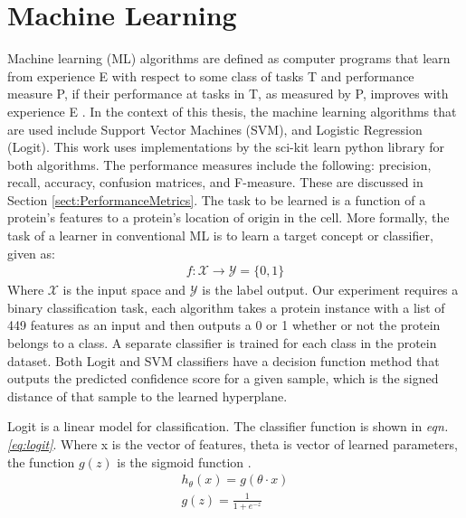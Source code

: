 \documentclass[ms]{nuthesis}
\begin{document}
\section{Machine Learning}
\label{sect:machineLearn}
Machine learning (ML) algorithms are defined as computer programs that learn from experience E
with respect to some class of tasks T and performance measure P, if their performance at
tasks in T, as measured by P, improves with experience E \cite{mitchell}. In the context of this thesis,
the machine learning algorithms that are used include Support Vector Machines (SVM), and Logistic Regression (Logit).
 This work uses implementations by the sci-kit learn python library \cite{sklearn-api} for both algorithms. The performance
 measures include the following: precision, recall, accuracy, confusion matrices, and F-measure. These are discussed in
 Section \ref{sect:PerformanceMetrics}. The task to be learned is a function of a protein's
    features to a protein's location of origin in the cell. More formally, the task of a learner in conventional ML
    is to learn a target concept or classifier, given as:
 \FloatBarrier
\begin{equation}
\label{eq:convML}
\begin{aligned}
f : {\mathcal X} \rightarrow {\mathcal Y}=\{0, 1\}
\end{aligned}
\end{equation}
\FloatBarrier
Where $\mathcal X$ is the input space and $\mathcal Y$ is the label output. Our experiment requires a binary
classification task, each algorithm takes a protein instance with a list of 449 features
 as an input and then outputs a 0 or 1 whether or not the protein belongs to a class. A separate classifier is trained
 for each class in the protein dataset. Both Logit and SVM classifiers have a decision function method that outputs
 the predicted confidence score for a given sample, which is the signed distance of that sample to the learned
 hyperplane.
 \par Logit is a linear model for classification. The classifier function is shown in \textit{eqn. \ref{eq:logit}}.
 Where x is the vector of features, theta is vector of learned parameters, the function $g(z)$ is the sigmoid
 function \cite{Coursera}.
\FloatBarrier
\begin{equation}
\label{eq:logit}
\begin{aligned}
h_{\theta}(x) = g(\theta \cdot x) \\
g(z) = \frac{1}{1+e^{-z}}
\end{aligned}
\end{equation}
\end{document}
